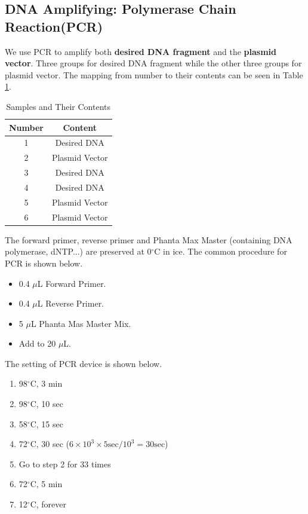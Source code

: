 \documentclass{article}
\begin{document}
\subsection{DNA Amplifying: Polymerase Chain Reaction(PCR)}
We use PCR to amplify both \textbf{desired DNA fragment} and the \textbf{plasmid vector}. Three groups for desired DNA fragment while the other three groups for plasmid vector. The mapping from number to their contents can be seen in Table \ref{Samples and Their Contents}.
\begin{table}
    \centering
    \begin{tabular}{|c|c|} \hline 
         Number& Content\\ \hline 
         1& Desired DNA\\ \hline 
         2& Plasmid Vector\\ \hline 
         3& Desired DNA\\ \hline 
         4& Desired DNA\\ \hline 
         5& Plasmid Vector\\ \hline 
         6& Plasmid Vector\\ \hline
    \end{tabular}
    \caption{Samples and Their Contents}
    \label{Samples and Their Contents}
\end{table}
The forward primer, reverse primer and Phanta Max Master (containing DNA polymerase, dNTP...) are preserved at 0$^\circ$C in ice. The common procedure for PCR is shown below.
\begin{itemize}
    \item 0.4 $\mu$L Forward Primer.
    \item 0.4 $\mu$L Reverse Primer.
    \item 5 $\mu$L Phanta Mas Master Mix.
    \item Add  to 20 $\mu$L.

\end{itemize}
The setting of PCR device is shown below.
\begin{enumerate}
    \item 98$^\circ$C, 3 min
    \item 98$^\circ$C, 10 sec
    \item 58$^\circ$C, 15 sec
    \item 72$^\circ$C,  30 sec      ($6\times 10 ^3 \times 5 \mathrm{sec}/10^3 = 30 \mathrm{sec}$)
    \item Go to step 2 for 33 times
    \item 72$^\circ$C, 5 min
    \item 12$^\circ$C, forever
\end{enumerate}
\end{document}
